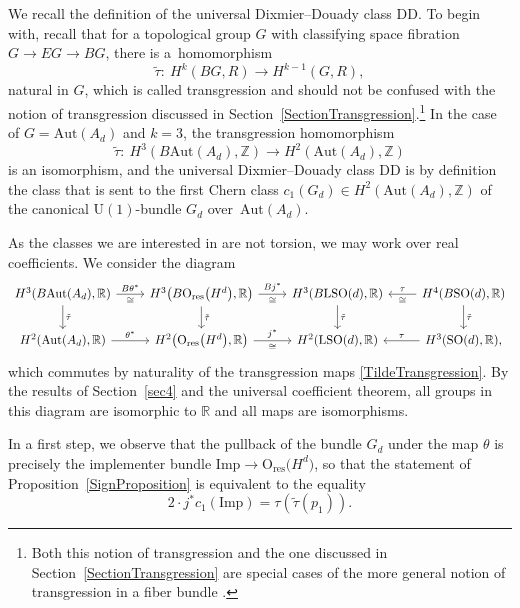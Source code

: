 \documentclass[10pt,a4paper]{amsart}
\numberwithin{equation}{section}
\newcommand{\R}{\mathbb{R}}
\newcommand{\Z}{\mathbb{Z}}
\newcommand{\SO}{\mathrm{SO}}
\newcommand{\res}{\mathrm{res}}
\newcommand{\Aut}{\mathrm{Aut}}
\newcommand{\Imp}{\mathrm{Imp}}
\newcommand{\U}{\mathrm{U}}
\renewcommand{\O}{\mathrm{O}}
\renewcommand{\L}{\mathrm{L}}
\newcommand{\DD}{\mathrm{DD}}
\begin{document}
We recall the definition of the universal Dixmier--Douady class $\DD$.
To begin with, recall that for a topological group $G$ with classifying space fibration $G \to EG \to BG$, there is a~homomorphism
\begin{equation*}
 \tilde{\tau} \colon\ H^k(BG, R) \longrightarrow H^{k-1}(G, R),
\end{equation*}
natural in $G$, which is called transgression and should not be confused with the notion of transgression discussed in Section~\ref{SectionTransgression}.\footnote{Both this notion of transgression and the one discussed in Section~\ref{SectionTransgression} are special cases of the more general notion of transgression in a fiber bundle \cite{Borel}.}
In the case of $G = \Aut(A_d)$ and $k=3$, the transgression homomorphism
\begin{equation}
\label{TildeTransgression}
\tilde{\tau} \colon\ H^3(B\Aut(A_d), \Z) \longrightarrow H^2(\Aut(A_d), \Z)	
\end{equation}
is an isomorphism, and the universal Dixmier--Douady class $\DD$ is by definition the class that is sent to the first Chern class $c_1(G_d) \in H^2(\Aut(A_d), \Z)$ of the canonical $\U(1)$-bundle $G_d$ over~$\Aut(A_d)$.




As the classes we are interested in are not torsion, we may work over real coefficients.
We consider the diagram
\begin{equation*}
\begin{tikzcd}[column sep=0.8cm]
H^3(B\Aut(A_d), \R)
	\ar[r, "B\theta^*", "\cong"']
	\ar[d, "\tilde{\tau}"]
&
H^3\big(B\O_{\res}\big(H^d\big), \R\big)
	\ar[r, "Bj^*", "\cong"']
	\ar[d, "\tilde{\tau}"]
&
H^3(B\L\SO(d), \R)
	\ar[d, "\tilde{\tau}"]
&
H^4(B\SO(d), \R)
\ar[l, "\tau"', "\cong"]
	\ar[d, "\tilde{\tau}"]
\\
H^2(\Aut(A_d), \R)
	\ar[r, "\theta^*"]
&
H^2\big(\O_{\res}\big(H^d\big), \R\big)
	\ar[r, "j^*", "\cong"']
&
H^2(\L \SO(d), \R)
&
H^3(\SO(d), \R),
\ar[l, "\tau"']
\end{tikzcd}
\end{equation*}
which commutes by naturality of the transgression maps \eqref{TildeTransgression}.
By the results of Section~\ref{sec4} and the universal coefficient theorem, all groups in this diagram are isomorphic to $\R$ and all maps are isomorphisms.

In a first step, we observe that the pullback of the bundle $G_d$ under the map $\theta$ is precisely the implementer bundle $\Imp \to \O_{\mathrm{res}}\big(H^d\big)$, so that the statement of Proposition~\ref{SignProposition} is equivalent to the equality
\begin{equation*}
	2\cdot j^*c_1(\Imp) = \tau (\tilde{\tau}(p_1)).
\end{equation*}
\end{document}
